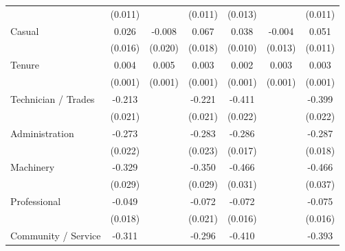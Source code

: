{\begin{tabular}{l*{6}{c}}
                    &     (0.011)         &                     &     (0.011)         &     (0.013)         &                     &     (0.011)         \\
Casual              &       0.026         &      -0.008         &       0.067\sym{***}&       0.038\sym{***}&      -0.004         &       0.051\sym{***}\\
                    &     (0.016)         &     (0.020)         &     (0.018)         &     (0.010)         &     (0.013)         &     (0.011)         \\
Tenure              &       0.004\sym{***}&       0.005\sym{***}&       0.003\sym{***}&       0.002\sym{***}&       0.003\sym{***}&       0.003\sym{***}\\
                    &     (0.001)         &     (0.001)         &     (0.001)         &     (0.001)         &     (0.001)         &     (0.001)         \\
Technician / Trades &      -0.213\sym{***}&                     &      -0.221\sym{***}&      -0.411\sym{***}&                     &      -0.399\sym{***}\\
                    &     (0.021)         &                     &     (0.021)         &     (0.022)         &                     &     (0.022)         \\
Administration      &      -0.273\sym{***}&                     &      -0.283\sym{***}&      -0.286\sym{***}&                     &      -0.287\sym{***}\\
                    &     (0.022)         &                     &     (0.023)         &     (0.017)         &                     &     (0.018)         \\
Machinery           &      -0.329\sym{***}&                     &      -0.350\sym{***}&      -0.466\sym{***}&                     &      -0.466\sym{***}\\
                    &     (0.029)         &                     &     (0.029)         &     (0.031)         &                     &     (0.037)         \\
Professional        &      -0.049\sym{***}&                     &      -0.072\sym{***}&      -0.072\sym{***}&                     &      -0.075\sym{***}\\
                    &     (0.018)         &                     &     (0.021)         &     (0.016)         &                     &     (0.016)         \\
Community / Service &      -0.311\sym{***}&                     &      -0.296\sym{***}&      -0.410\sym{***}&                     &      -0.393\sym{***}\\

\end{tabular}}
